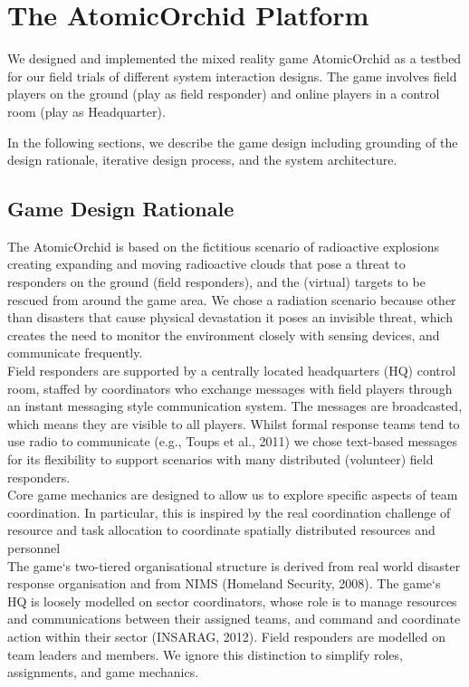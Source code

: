 \section{The AtomicOrchid Platform}
We designed and implemented the mixed reality game AtomicOrchid as a testbed for our field trials of different system interaction designs. The game involves field players on the ground (play as field responder) and online players in a control room (play as Headquarter). 


In the following sections, we describe the game design including grounding of the design rationale,  iterative design process, and the system architecture.

\subsection{Game Design Rationale}
The AtomicOrchid is based on the fictitious scenario of radioactive explosions creating expanding and moving radioactive clouds that pose a threat to responders on the ground (field responders), and the (virtual) targets to be rescued from around the game area. We chose a radiation scenario because other than disasters that cause physical devastation it poses an invisible threat, which creates the need to monitor the environment closely with sensing devices, and communicate frequently.\\

Field responders are supported by a centrally located headquarters (HQ) control room, staffed by coordinators who exchange messages with field players through an instant messaging style communication system. The messages are broadcasted, which means they are visible to all players. Whilst formal response teams tend to use radio to communicate (e.g., Toups et al., 2011) we chose text-based messages for its flexibility to support scenarios with many distributed (volunteer) field responders.\\

Core game mechanics are designed to allow us to explore specific aspects of team coordination. In particular, this is inspired by the real coordination challenge of resource and task allocation to coordinate spatially distributed resources and personnel\\

The game`s two-tiered organisational structure is derived from real world disaster response organisation and from NIMS (Homeland Security, 2008). The game`s HQ is loosely modelled on sector coordinators, whose role is to manage resources and communications between their assigned teams, and command and coordinate action within their sector (INSARAG, 2012). Field responders are modelled on team leaders and members. We ignore this distinction to simplify roles, assignments, and game mechanics.\\

